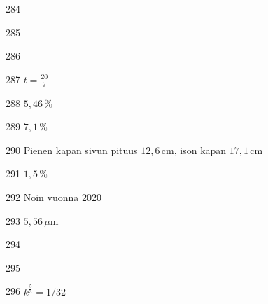 \begin{Vastaus}{284}
	
\end{Vastaus}
\begin{Vastaus}{285}
	
\end{Vastaus}
\begin{Vastaus}{286}
	
\end{Vastaus}
\begin{Vastaus}{287}
	$t=\frac{20}{7}$
    
\end{Vastaus}
\begin{Vastaus}{288}
$5,46\,\%$
	
\end{Vastaus}
\begin{Vastaus}{289}
$7,1\,\%$
	
\end{Vastaus}
\begin{Vastaus}{290}
Pienen kapan sivun pituus $12,6$\,cm, ison kapan $17,1$\,cm
	
\end{Vastaus}
\begin{Vastaus}{291}
$1,5\,\%$
\end{Vastaus}
\begin{Vastaus}{292}
Noin vuonna 2020
\end{Vastaus}
\begin{Vastaus}{293}
	$5,56$\,$\mu$m
	
\end{Vastaus}
\begin{Vastaus}{294}
	
\end{Vastaus}
\begin{Vastaus}{295}
\end{Vastaus}
\begin{Vastaus}{296}
		$k^\frac{5}{3}=1/32$
	
\end{Vastaus}
